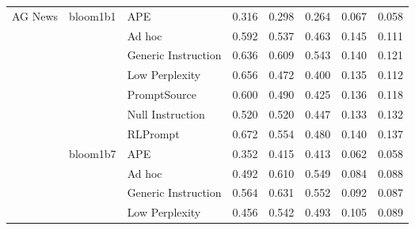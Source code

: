 \onecolumn
\tiny
{}
\tablelasttail{\hline}
\label{table:all_results}
\begin{supertabular}{lllrrrrr}
AG News & bloom1b1 & APE &            0.316 &           0.298 &          0.264 &        0.067 &    0.058 \\
              &        & Ad hoc &            0.592 &           0.537 &          0.463 &        0.145 &    0.111 \\
              &        & Generic Instruction &            0.636 &           0.609 &          0.543 &        0.140 &    0.121 \\
              &        & Low Perplexity &            0.656 &           0.472 &          0.400 &        0.135 &    0.112 \\
              &        & PromptSource &            0.600 &           0.490 &          0.425 &        0.136 &    0.118 \\
              &        & Null Instruction &            0.520 &           0.520 &          0.447 &        0.133 &    0.132 \\
              &        & RLPrompt &            0.672 &           0.554 &          0.480 &        0.140 &    0.137 \\
              & bloom1b7 & APE &            0.352 &           0.415 &          0.413 &        0.062 &    0.058 \\
              &        & Ad hoc &            0.492 &           0.610 &          0.549 &        0.084 &    0.088 \\
              &        & Generic Instruction &            0.564 &           0.631 &          0.552 &        0.092 &    0.087 \\
              &        & Low Perplexity &            0.456 &           0.542 &          0.493 &        0.105 &    0.089 \\

\end{supertabular}
